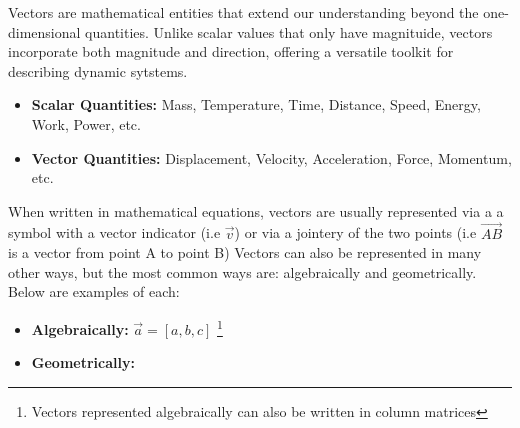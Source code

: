 \documentclass[12.5pt]{article}
\begin{document}
        \begin{flushleft}

            Vectors are mathematical entities that extend our understanding beyond the 
            one-dimensional quantities. Unlike scalar values that only have magnituide, 
            vectors incorporate both magnitude and direction, offering a versatile toolkit
            for describing dynamic sytstems. 

            \begin{itemize}
                \item \textbf{Scalar Quantities:} Mass, Temperature, Time, Distance, Speed, 
                Energy, Work, Power, etc.
                \item \textbf{Vector Quantities:} Displacement, Velocity, Acceleration, 
                Force, Momentum, etc.
            \end{itemize}

            When written in mathematical equations, vectors are usually represented via a a symbol with a vector indicator (i.e $\vec{v}$)
            or via a jointery of the two points (i.e $\vec{AB}$ is a vector from point A to point B) Vectors 
            can also be represented in many other ways, but the most common ways are: algebraically and geometrically. Below are examples of each:

            \begin{itemize}

                \item \textbf{Algebraically:} $\vec{a} = \left[ a, b, c \right]$ \footnote{Vectors represented algebraically can also be written in column matrices}

                \item { \textbf{Geometrically:} 

                    \begin{center}

\end{center}}
\end{itemize}
\end{flushleft}
\end{document}
